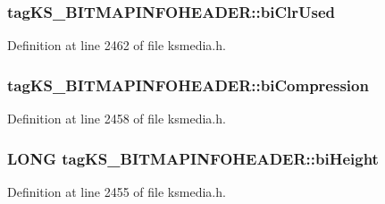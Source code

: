 \subsubsection[{\texorpdfstring{bi\+Clr\+Used}{biClrUsed}}]{ tag\+K\+S\+\_\+\+B\+I\+T\+M\+A\+P\+I\+N\+F\+O\+H\+E\+A\+D\+E\+R\+::bi\+Clr\+Used}\hypertarget{structtag_k_s___b_i_t_m_a_p_i_n_f_o_h_e_a_d_e_r_a64a62cdcf6133ea050330f58e120ec42}{}\label{structtag_k_s___b_i_t_m_a_p_i_n_f_o_h_e_a_d_e_r_a64a62cdcf6133ea050330f58e120ec42}


Definition at line 2462 of file ksmedia.\+h.

\subsubsection[{\texorpdfstring{bi\+Compression}{biCompression}}]{ tag\+K\+S\+\_\+\+B\+I\+T\+M\+A\+P\+I\+N\+F\+O\+H\+E\+A\+D\+E\+R\+::bi\+Compression}\hypertarget{structtag_k_s___b_i_t_m_a_p_i_n_f_o_h_e_a_d_e_r_a13525348f3d18bdfd751c05be11ed3a0}{}\label{structtag_k_s___b_i_t_m_a_p_i_n_f_o_h_e_a_d_e_r_a13525348f3d18bdfd751c05be11ed3a0}


Definition at line 2458 of file ksmedia.\+h.

\subsubsection[{\texorpdfstring{bi\+Height}{biHeight}}]{\setlength{\rightskip}{0pt plus 5cm}L\+O\+NG tag\+K\+S\+\_\+\+B\+I\+T\+M\+A\+P\+I\+N\+F\+O\+H\+E\+A\+D\+E\+R\+::bi\+Height}\hypertarget{structtag_k_s___b_i_t_m_a_p_i_n_f_o_h_e_a_d_e_r_a27992a6e076cc0e595577c117b0d03a7}{}\label{structtag_k_s___b_i_t_m_a_p_i_n_f_o_h_e_a_d_e_r_a27992a6e076cc0e595577c117b0d03a7}


Definition at line 2455 of file ksmedia.\+h.

